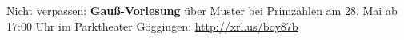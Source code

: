 \documentclass{algblatt}
\begin{document}
\vspace*{-1.5cm}

Nicht verpassen: \textbf{Gauß-Vorlesung} über Muster bei Primzahlen am 28. Mai
ab 17:00 Uhr im Parktheater Göggingen:
\url{http://xrl.us/boy87b}
 
\end{document}
